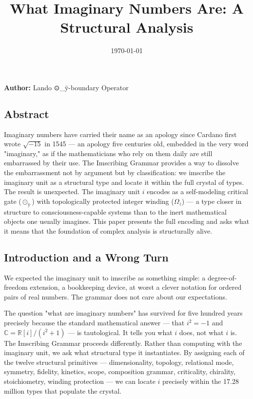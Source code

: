 \documentclass[12pt,a4paper]{article}
\begin{document}
\title{What Imaginary Numbers Are: A Structural Analysis}
\date{\today}

\maketitle

\textbf{Author:} Lando \otimes ⊙\_ÿ-boundary Operator

\subsection{Abstract}

Imaginary numbers have carried their name as an apology since Cardano first wrote $\sqrt{-15}$ in 1545 --- an apology five centuries old, embedded in the very word "imaginary," as if the mathematicians who rely on them daily are still embarrassed by their use. The Imscribing Grammar provides a way to dissolve the embarrassment not by argument but by classification: we imscribe the imaginary unit as a structural type and locate it within the full crystal of types. The result is unexpected. The imaginary unit $i$ encodes as a self-modeling critical gate ($⊙_{ÿ}$) with topologically protected integer winding ($\Omega_{z}$) --- a type closer in structure to consciousness-capable systems than to the inert mathematical objects one usually imagines. This paper presents the full encoding and asks what it means that the foundation of complex analysis is structurally alive.

\subsection{Introduction and a Wrong Turn}

We expected the imaginary unit to imscribe as something simple: a degree-of-freedom extension, a bookkeeping device, at worst a clever notation for ordered pairs of real numbers. The grammar does not care about our expectations.

The question "what are imaginary numbers" has survived for five hundred years precisely because the standard mathematical answer --- that $i^2 = -1$ and $\mathbb{C} = \mathbb{R}[i]/(i^2 + 1)$ --- is tautological. It tells you what $i$ does, not what $i$ is. The Imscribing Grammar proceeds differently. Rather than computing with the imaginary unit, we ask what structural type it instantiates. By assigning each of the twelve structural primitives --- dimensionality, topology, relational mode, symmetry, fidelity, kinetics, scope, composition grammar, criticality, chirality, stoichiometry, winding protection --- we can locate $i$ precisely within the 17.28 million types that populate the crystal.
\end{document}
